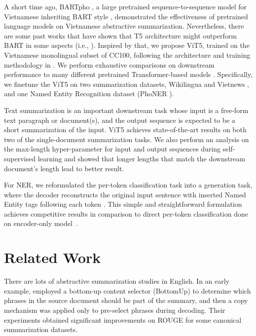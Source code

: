 \documentclass[11pt,a4paper]{article}
\begin{document}
A short time ago, BARTpho \cite{bartpho}, a large pretrained sequence-to-sequence model for Vietnamese inheriting BART style \cite{bart}, demonstrated the effectiveness of pretrained language models on Vietnamese abstractive summarization. Nevertheless, there are some past works that have shown that T5 architecture \cite{t5} might outperform BART in some aspects (i.e., \cite{phan-etal-2021-cotext}).
Inspired by that, we propose ViT5, trained on the Vietnamese monolingual subset of CC100, following the architecture and training methodology in \citet{t5}. We perform exhaustive comparisons on downstream performance to many different pretrained Transformer-based models \cite{nguyen2021viesum, bartpho, to2021monolingual}. Specifically, we finetune the ViT5 on two summarization datasets, Wikilingua \cite{wikilingual} and Vietnews \cite{vietnews}, and one Named Entity Recognition dataset (PhoNER \cite{PhoNER_COVID19}).

Text summarization is an important downstream task whose input is a free-form text paragraph or document(s), and the output sequence is expected to be a short summarization of the input. ViT5 achieves state-of-the-art results on both two of the single-document summarization tasks. We also perform an analysis on the max-length hyper-parameter for input and output sequences during self-supervised learning and showed that longer lengths that match the downstream document's length lead to better result.

For NER, we reformulated the per-token classification task into a generation task, where the decoder reconstructs the original input sentence with inserted Named Entity tags following each token \cite{scifive}. This simple and straightforward formulation achieves competitive results in comparison to direct per-token classification done on encoder-only model~\cite{phobert}.
\label{introduction}
 
\section{Related Work}
There are lots of abstractive summarization studies in English. In an early example, \cite{gehrmann-etal-2018-bottom} employed a bottom-up content selector (BottomUp) to determine which phrases in the source document should be part of the summary, and then a copy mechanism was applied only to pre-select phrases during decoding. Their experiments obtained significant improvements on ROUGE for some canonical summarization datasets. 
\end{document}
